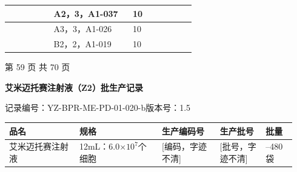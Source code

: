 \documentclass[UTF8,10pt,a4paper,fontset=fandol]{ctexart}
\newcommand{\fieldvalue}[1]{#1}
\newcommand{\handwritten}[1]{#1}
\begin{document}
\begin{center}
\begin{tabular}{|p{0.22\linewidth}|p{0.39\linewidth}|p{0.18\linewidth}|p{0.13\linewidth}|}
\hline
&
\fieldvalue{\handwritten{A2，3，A1-037}} &
\fieldvalue{\handwritten{10}} &\\
\hline
&
\fieldvalue{\handwritten{A3，3，A1-026}} &
\fieldvalue{\handwritten{10}} &\\
\hline
&
\fieldvalue{\handwritten{B2，2，A1-019}} &
\fieldvalue{\handwritten{10}} &\\
\hline
\end{tabular}
\end{center}

\noindent\hfill 第 59 页 共 70 页

\newpage

\begin{center}
\textbf{艾米迈托赛注射液（Z2）批生产记录}
\end{center}

\noindent
记录编号：YZ-BPR-ME-PD-01-020-b\hfill 版本号：1.5

\begin{center}
\small
\begin{tabular}{|p{0.23\linewidth}|p{0.27\linewidth}|p{0.19\linewidth}|p{0.15\linewidth}|p{0.10\linewidth}|}
\hline
\centering 品名 & \centering 规格 & \centering 生产编码号 & \centering 生产批号 & \centering 批量\\
\hline
\centering 艾米迈托赛注射液 &
\centering 12mL：6.0$\times 10^{7}$个细胞 &
\fieldvalue{\handwritten{[编码，字迹不清]}} &
\fieldvalue{\handwritten{[批号，字迹不清]}} &
\centering 200--480袋\\
\hline
\end{tabular}
\end{center}
\end{document}
